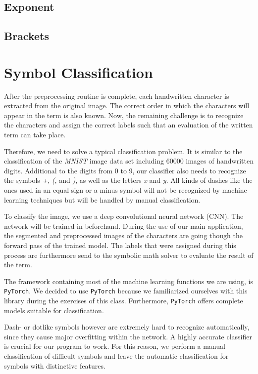 \documentclass[12pt]{article}
\begin{document}
\begin{itemize}
\begin{itemize}
\begin{itemize}
\begin{itemize}
\begin{itemize}
\begin{itemize}
\begin{itemize}
\begin{itemize}
\begin{itemize}
\begin{itemize}
	\subsection{Exponent}
	
	\subsection{Brackets}
	
\section{Symbol Classification}
After the preprocessing routine is complete, each handwritten character is extracted from the original image. The correct order in which the characters will appear in the term is also known. Now, the remaining challenge is to recognize the characters and assign the correct labels such that an evaluation of the written term can take place.
	
	Therefore, we need to solve a typical classification problem. It is similar to the classification of the \textit{MNIST} image data set including 60000 images of handwritten digits. Additional to the digits from 0 to 9, our classifier also needs to recognize the symbols \textit{+}, \textit{(}, and \textit{)}, as well as the letters \textit{x} and \textit{y}. All kinds of dashes like the ones used in an equal sign or a minus symbol will not be recognized by machine learning techniques but will be handled by manual classification.
	
	To classify the image, we use a deep convolutional neural network (CNN). The network will be trained in beforehand. During the use of our main application, the segmented and preprocessed images of the characters are going though the forward pass of the trained model. The labels that were assigned during this process are furthermore send to the symbolic math solver to evaluate the result of the term. 
	
	The framework containing most of the machine learning functions we are using, is \texttt{PyTorch}. We decided to use \texttt{PyTorch} because we familiarized ourselves with this library during the exercises of this class. Furthermore, \texttt{PyTorch} offers complete models suitable for classification.
		
	Dash- or dotlike symbols however are extremely hard to recognize automatically, since they cause major overfitting within the network. A highly accurate classifier is crucial for our program to work. For this reason, we perform a manual classification of difficult symbols and leave the automatic classification for symbols with distinctive features.
	

\end{itemize}
\end{itemize}
\end{itemize}
\end{itemize}
\end{itemize}
\end{itemize}
\end{itemize}
\end{itemize}
\end{itemize}
\end{itemize}
\end{document}
